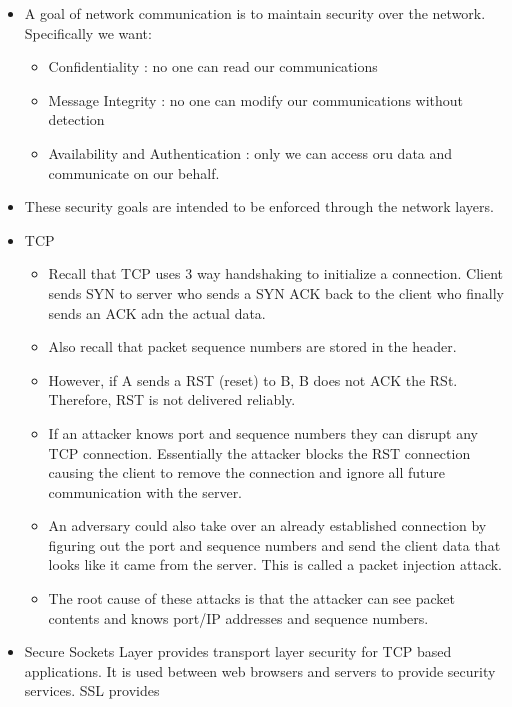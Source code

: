 \begin{itemize}
\tightlist
\item
  A goal of network communication is to maintain security over the
  network. Specifically we want:

  \begin{itemize}
  \tightlist
  \item
    Confidentiality : no one can read our communications
  \item
    Message Integrity : no one can modify our communications without
    detection
  \item
    Availability and Authentication : only we can access oru data and
    communicate on our behalf.
  \end{itemize}
\item
  These security goals are intended to be enforced through the network
  layers.
\item
  TCP

  \begin{itemize}
  \tightlist
  \item
    Recall that TCP uses 3 way handshaking to initialize a connection.
    Client sends SYN to server who sends a SYN ACK back to the client
    who finally sends an ACK adn the actual data.
  \item
    Also recall that packet sequence numbers are stored in the header.
  \item
    However, if A sends a RST (reset) to B, B does not ACK the RSt.
    Therefore, RST is not delivered reliably.
  \item
    If an attacker knows port and sequence numbers they can disrupt any
    TCP connection. Essentially the attacker blocks the RST connection
    causing the client to remove the connection and ignore all future
    communication with the server.
  \item
    An adversary could also take over an already established connection
    by figuring out the port and sequence numbers and send the client
    data that looks like it came from the server. This is called a
    packet injection attack.
  \item
    The root cause of these attacks is that the attacker can see packet
    contents and knows port/IP addresses and sequence numbers.
  \end{itemize}
\item
  Secure Sockets Layer provides transport layer security for TCP based
  applications. It is used between web browsers and servers to provide
  security services. SSL provides


\end{itemize}
